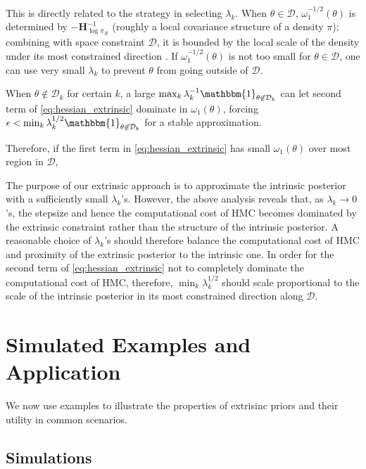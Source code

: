\documentclass[10pt]{article}
\newcommand{\mc}[1]{\mathcal{#1}}
\DeclareMathOperator{\1}{\mathbbm{1}}
\newcommand{\dt}{\epsilon} %
\newcommand{\hess}{\mathbf{H}} %
\begin{document}
This is directly related to the strategy in selecting $\lambda_k$. When $\theta\in \mc D$, $\omega_1^{-1 / 2}(\theta)$ is determined by $- \hess_{\log \pi_\mc R}^{-1}$ (roughly a local covariance structure of a density $\pi$); combining with space constraint $\mc D$, it is bounded by the local scale of the density under its most constrained direction \citep{neal2011mcmc}. If $\omega_1^{-1 / 2}(\theta)$ is not too small for $\theta \in \mc D$, one can use very small $\lambda_k$ to prevent $\theta$ from going outside of $\mc D$.


When $\theta \not \in \mc D_k$ for certain $k$, a large $\max_k \lambda_k^{-1} \mathbbm{1}_{\theta\not\in \mc D_k}$ can let second term of \eqref{eq:hessian_extrinsic} dominate in $\omega_1(\theta)$, forcing $\dt <\min_k \lambda_k^{1/2}\mathbbm{1}_{\theta\not\in \mc D_k}$ for a stable approximation.









Therefore, if the first term in \eqref{eq:hessian_extrinsic} has small $\omega_1(\theta)$ over most region in $\mc D$, 


The purpose of our extrinsic approach is to approximate the intrinsic posterior with a sufficiently small $\lambda_k$'s. However, the above analysis reveals that, as $\lambda_k \to 0$'s, the stepsize and hence the computational cost of HMC becomes dominated by the extrinsic constraint rather than the structure of the intrinsic posterior. A reasonable choice of $\lambda_k$'s should therefore balance the computational cost of HMC and  proximity of the extrinsic posterior to the intrinsic one. In order for the second term of \eqref{eq:hessian_extrinsic} not to completely dominate the computational cost of HMC, therefore, $\min_k \lambda_k^{1/2}$ should scale proportional to the scale of the intrinsic posterior in its most constrained direction along $\mc D$.




\section{Simulated Examples and Application}

We now use examples to illustrate the properties of extrisinc priors and their utility in common scenarios.

\subsection{Simulations}
\end{document}
